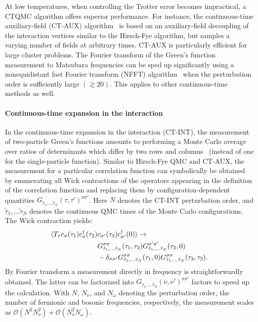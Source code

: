 \documentclass[rmp,aps,reprint,amsmath,amssymb,superscriptaddress,showpacs,nofootinbib]{revtex4-1}
\begin{document}
At low temperatures, when controlling the Trotter error becomes impractical, a CTQMC algorithm  offers superior performance. For instance, the continuous-time auxiliary-field (CT-AUX) algorithm~\cite{Gull2008a} is based on an auxiliary-field decoupling of the interaction vertices similar to the Hirsch-Fye algorithm, but samples a varying number of fields at arbitrary times. CT-AUX is particularly efficient for large cluster problems. The Fourier transform of the Green's function measurement to Matsubara frequencies can be sped up significantly using a nonequidistant fast Fourier transform (NFFT) algorithm~\cite{Staar2012}  when the perturbation order is sufficiently large $(\gtrsim 20)$. This applies to other continuous-time methods as well.

\paragraph{Continuous-time expansion in the interaction}

In  the  continuous-time expansion in the interaction (CT-INT), the measurement of two-particle Green's functions amounts to performing a Monte Carlo average over ratios of determinants which differ by two rows and columns~\cite{Rubtsov2005,Gull2011} (instead of one for the single-particle function). Similar to  Hirsch-Fye QMC and CT-AUX, the measurement for a particular correlation function can symbolically be obtained by enumerating all Wick contractions of the operators appearing in the definition of the correlation function and replacing them by configuration-dependent quantities $G_{\tilde{\tau}_{1},\ldots\tilde{\tau}_{N}}(\tau,\tau')^{\sigma\sigma'}$. Here $N$ denotes the CT-INT perturbation order, and $\tilde{\tau}_{1},\ldots\tilde{\tau}_{N}$ denotes the continuous QMC times of the Monte Carlo configurations. The Wick contraction yields:
\begin{align}
\langle T_{\tau}c_{\sigma}(\tau_{1})c^{\dagger}_{\sigma}(\tau_{2}) &c_{\sigma'}(\tau_{3})  c^{\dagger}_{\sigma'}(0)\rangle \to
\\
& G_{\tilde{\tau}_{1},\ldots\tilde{\tau}_{N}}^{\sigma\sigma}(\tau_{1},\tau_{2})G_{\tilde{\tau}_{1},\ldots\tilde{\tau}_{N}}^{\sigma'\sigma'}(\tau_{3},0)\notag\\
&-\delta_{\sigma\sigma'} G_{\tilde{\tau}_{1},\ldots\tilde{\tau}_{N}}^{\sigma\sigma}(\tau_{1},0)G_{\tilde{\tau}_{1},\ldots\tilde{\tau}_{N}}^{\sigma\sigma}(\tau_{3},\tau_{2}). \nonumber
\end{align}
By Fourier transform a measurement directly in frequency is straightforwardly obtained. The latter can be factorized into $G_{\tilde{\tau}_{1},\ldots\tilde{\tau_{N}}}(\nu,\nu')^{\sigma\sigma'}$ factors to speed up the calculation. With $N$, $N_{\nu}$, and $N_{\omega}$ denoting the perturbation order, the number of fermionic and bosonic frequencies, respectively, the measurement scales as $\mathcal{O}(N^{2}N_{\nu}^{2})+\mathcal{O}(N_{\nu}^{2}N_{\omega})$.
\end{document}
